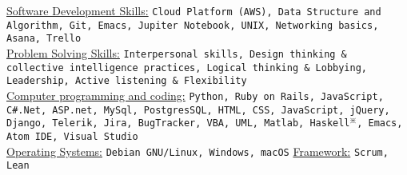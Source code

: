 \documentclass[a4paper, 10pt]{article}
\begin{document}
\begin{center}
\begin{flushleft} 

	\uline{\fontsize{10pt}{10}\selectfont Software Development Skills:} \texttt{Cloud Platform (AWS),  Data Structure and Algorithm, Git, Emacs, Jupiter Notebook, UNIX, Networking basics, Asana, Trello}\\
		\uline{\fontsize{10pt}{10}\selectfont Problem Solving Skills:} \texttt{Interpersonal skills, Design thinking \& collective intelligence practices, Logical thinking \& Lobbying, Leadership, Active listening \& Flexibility}\\
		\uline {\fontsize{10pt}{10}\selectfont Computer programming and coding:} \texttt{Python, Ruby on Rails, JavaScript, C\#\/.Net, ASP.net, MySql, PostgresSQL, HTML, CSS, JavaScript, jQuery, Django, Telerik, Jira, BugTracker, VBA, UML, Matlab, Haskell$^{\divideontimes} $, Emacs, Atom IDE, Visual Studio}\\
		\uline {\fontsize{10pt}{10}\selectfont Operating Systems:} \texttt{Debian GNU/Linux, Windows, macOS} \hspace{2cm} \uline {\fontsize{10pt}{10}\selectfont Framework:} \texttt{Scrum, Lean} \\
\end{flushleft}

\vspace{-6ex}

\end{center}
\end{document}
